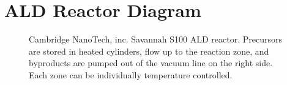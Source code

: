 \section{ALD Reactor Diagram}
\label{sup:ALD-design}

\begin{figure}[htb]
   \centering
	\hspace{1cm}
   \caption[Cambridge NanoTech, inc. S100 ALD System]%
   		{Cambridge NanoTech, inc. Savannah S100 ALD reactor. Precursors are stored in heated cylinders, flow up to the reaction zone, and byproducts are pumped out of the vacuum line on the right side. Each zone can be individually temperature controlled.}
   \label{fig:S100}
\end{figure}

